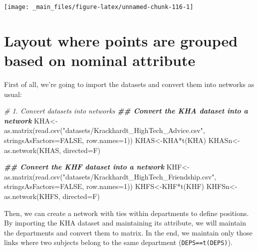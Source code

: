 \documentclass[
  notitlepage,
  onecolumn,
  openany]{book}
\newenvironment{Shaded}{\begin{snugshade}}{\end{snugshade}}
\newcommand{\AttributeTok}[1]{\textcolor[rgb]{0.77,0.63,0.00}{#1}}
\newcommand{\CommentTok}[1]{\textcolor[rgb]{0.56,0.35,0.01}{\textit{#1}}}
\newcommand{\ConstantTok}[1]{\textcolor[rgb]{0.00,0.00,0.00}{#1}}
\newcommand{\DecValTok}[1]{\textcolor[rgb]{0.00,0.00,0.81}{#1}}
\newcommand{\DocumentationTok}[1]{\textcolor[rgb]{0.56,0.35,0.01}{\textbf{\textit{#1}}}}
\newcommand{\FunctionTok}[1]{\textcolor[rgb]{0.00,0.00,0.00}{#1}}
\newcommand{\NormalTok}[1]{#1}
\newcommand{\OtherTok}[1]{\textcolor[rgb]{0.56,0.35,0.01}{#1}}
\newcommand{\SpecialCharTok}[1]{\textcolor[rgb]{0.00,0.00,0.00}{#1}}
\newcommand{\StringTok}[1]{\textcolor[rgb]{0.31,0.60,0.02}{#1}}
\begin{document}
\begin{center}\texttt{[image: \_main\_files/figure-latex/unnamed-chunk-116-1]} \end{center}

\hypertarget{layout-where-points-are-grouped-based-on-nominal-attribute}{%
\section{Layout where points are grouped based on nominal attribute}\label{layout-where-points-are-grouped-based-on-nominal-attribute}}

First of all, we're going to import the datasets and convert them into networks as usual:

\begin{Shaded}
\begin{Highlighting}[]
\CommentTok{\# 1. Convert datasets into networks}
\DocumentationTok{\#\# Convert the KHA dataset into a network}
\NormalTok{KHA}\OtherTok{\textless{}{-}}\FunctionTok{as.matrix}\NormalTok{(}\FunctionTok{read.csv}\NormalTok{(}\StringTok{"datasets/Krackhardt\_HighTech\_Advice.csv"}\NormalTok{,}
                        \AttributeTok{stringsAsFactors=}\ConstantTok{FALSE}\NormalTok{, }\AttributeTok{row.names=}\DecValTok{1}\NormalTok{))}
\NormalTok{KHAS}\OtherTok{\textless{}{-}}\NormalTok{KHA}\SpecialCharTok{*}\FunctionTok{t}\NormalTok{(KHA)}
\NormalTok{KHASn}\OtherTok{\textless{}{-}}\FunctionTok{as.network}\NormalTok{(KHAS, }\AttributeTok{directed=}\NormalTok{F)}

\DocumentationTok{\#\# Convert the KHF dataset into a network}
\NormalTok{KHF}\OtherTok{\textless{}{-}}\FunctionTok{as.matrix}\NormalTok{(}\FunctionTok{read.csv}\NormalTok{(}\StringTok{"datasets/Krackhardt\_HighTech\_Friendship.csv"}\NormalTok{,}
                        \AttributeTok{stringsAsFactors=}\ConstantTok{FALSE}\NormalTok{, }\AttributeTok{row.names=}\DecValTok{1}\NormalTok{))}
\NormalTok{KHFS}\OtherTok{\textless{}{-}}\NormalTok{KHF}\SpecialCharTok{*}\FunctionTok{t}\NormalTok{(KHF)}
\NormalTok{KHFSn}\OtherTok{\textless{}{-}}\FunctionTok{as.network}\NormalTok{(KHFS, }\AttributeTok{directed=}\NormalTok{F)}
\end{Highlighting}
\end{Shaded}

Then, we can create a network with ties within departments to define positions. By importing the KHA dataset and maintaining its attribute, we will maintain the departments and convert them to matrix. In the end, we maintain only those links where two subjects belong to the same department (\texttt{DEPS==t(DEPS)}).
\end{document}
